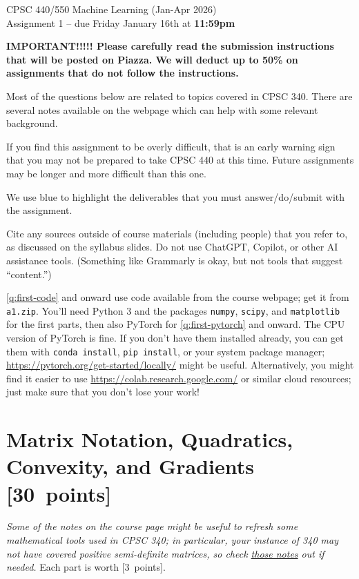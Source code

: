 \documentclass{article}
\newcommand{\ask}[1]{\textcolor{question}{#1}}
\newcommand{\pts}[1]{\textcolor{points}{[#1~points]}}
\newcommand{\meta}[1]{\textcolor{black!60!white}{\emph{#1}}}
\begin{document}
\begin{center}
\Large
CPSC 440/550 Machine Learning (Jan-Apr 2026)\\
Assignment 1 --
due Friday January 16th at \textbf{11:59pm}
\end{center}



\textbf{IMPORTANT!!!!! Please carefully read the submission instructions that will be posted on Piazza. We will deduct up to 50\% on assignments that do not follow the instructions.}

Most of the questions below are related to topics covered in CPSC 340. There are several notes available on the webpage which can help with some relevant background.

If you find this assignment to be overly difficult,
that is an early warning sign that you may not be prepared to take CPSC 440 at this time.
Future assignments may be longer and more difficult than this one.

We use \ask{blue} to highlight the deliverables that you must answer/do/submit with the assignment.

Cite any sources outside of course materials (including people) that you refer to,
as discussed on the syllabus slides.
Do not use ChatGPT, Copilot, or other AI assistance tools. (Something like Grammarly is okay, but not tools that suggest ``content.'')

\cref{q:first-code} and onward use code available from the course webpage;
get it from \texttt{a1.zip}.
You'll need Python 3 
and the packages \texttt{numpy}, \texttt{scipy}, and \texttt{matplotlib} for the first parts,
then also PyTorch for \cref{q:first-pytorch} and onward.
The CPU version of PyTorch is fine.
If you don't have them installed already,
you can get them with \texttt{conda install}, \texttt{pip install}, or your system package manager;
\url{https://pytorch.org/get-started/locally/} might be useful.
Alternatively, you might find it easier to use
\url{https://colab.research.google.com/}
or similar cloud resources;
just make sure that you don't lose your work!



\clearpage
\section{Matrix Notation, Quadratics, Convexity, and Gradients \pts{30}} \label{q:mat}
\meta{Some of the notes on the course page might be useful to refresh some mathematical tools used in CPSC 340;
in particular, your instance of 340 may not have covered positive semi-definite matrices, so check \href{https://www.cs.ubc.ca/~dsuth/440/25w2/notes/psd.pdf}{those notes} out if needed.}
Each part is worth \pts{3}.
\end{document}
